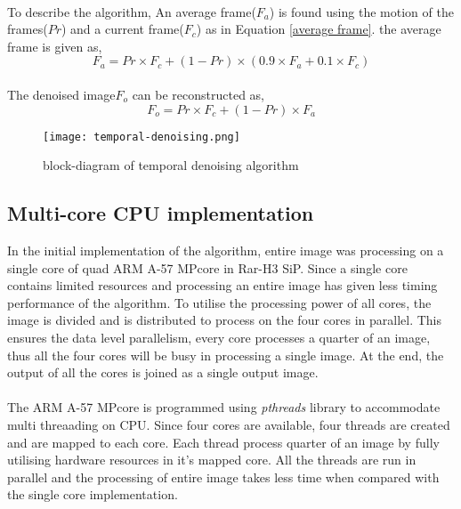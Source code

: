 \paragraph*{}To describe the algorithm, An average frame($F_a$) is found using the motion of the frames($Pr$) and a current frame($F_c$) as in Equation \ref{average frame}. the average frame is given as, 
\begin{equation}\label{average frame}
F_a = Pr \times F_c + (1-Pr)\times (0.9 \times F_a + 0.1 \times F_c)
\end{equation}
\paragraph*{} The denoised image$F_o$ can be reconstructed as,
\begin{equation}\label{denoised image}
F_o = Pr \times F_c + (1-Pr)\times  F_a
\end{equation}
\begin{figure}[h!]
	\centering
	\texttt{[image: temporal-denoising.png]}
	\caption{block-diagram of temporal denoising algorithm}
	\label{fig:temporal denoising}
\end{figure}
\subsection{Multi-core CPU implementation}
In the initial implementation of the algorithm, entire image was processing on a single core of quad ARM A-57 MPcore in Rar-H3 SiP.  Since a single core contains limited resources and processing an entire image has given less timing performance of the algorithm. To utilise the processing power of all cores, the image is divided and is distributed to process on the four cores in parallel. This ensures the data level parallelism, every core processes a quarter of an image, thus all the four cores will be busy in processing a single image. At the end, the output of all the cores is joined as a single output image.\paragraph*{}The ARM A-57 MPcore is programmed using \textit{pthreads} library to accommodate multi threaading on CPU. Since four cores are available, four threads are created and are mapped to each core. Each thread process quarter of an image by fully utilising hardware resources in it's mapped core. All the threads are run in parallel and the processing of entire image takes less time when compared with the single core implementation.
